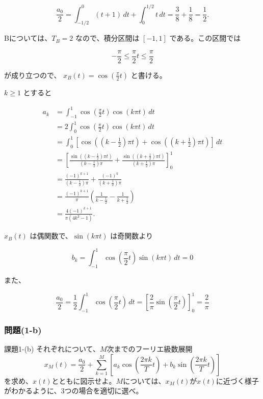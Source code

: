 \documentclass[a4j]{jarticle}
\begin{document}
\[
\frac{a_0}{2}
=\int_{-1/2}^{0}(t+1)\,dt+\int_0^{1/2}t\,dt
=\frac38+\frac18=\frac12.
\]

Bについては、$T_B=2$ なので、積分区間は $[-1,1]$ である。この区間では

\[
-\frac{\pi}{2}\le \frac{\pi}{2}t\le \frac{\pi}{2}
\]

が成り立つので、 $x_B(t)=\cos(\frac{\pi}{2}t)$ と書ける。

$k\ge 1$ とすると

\[
\begin{aligned}
a_k
&=\int_{-1}^{1}\cos\left(\frac{\pi}{2}t\right)\cos(k\pi t)\,dt\\
&=2\int_0^1\cos\left(\frac{\pi}{2}t\right)\cos(k\pi t)\,dt\\
&=\int_0^1\left[
\cos\left(\left(k-\frac12\right)\pi t\right)
+\cos\left(\left(k+\frac12\right)\pi t\right)
\right]\,dt\\
&=\left[
\frac{\sin\left(\left(k-\frac12\right)\pi t\right)}{\left(k-\frac12\right)\pi}
+\frac{\sin\left(\left(k+\frac12\right)\pi t\right)}{\left(k+\frac12\right)\pi}
\right]_0^1\\
&=\frac{(-1)^{k+1}}{\left(k-\frac12\right)\pi}
+\frac{(-1)^k}{\left(k+\frac12\right)\pi}\\
&=\frac{(-1)^{k+1}}{\pi}
\left(\frac{1}{k-\frac12}-\frac{1}{k+\frac12}\right)\\
&=\frac{4(-1)^{k+1}}{\pi(4k^2-1)}.
\end{aligned}
\]

$x_B(t)$ は偶関数で、$\sin(k\pi t)$ は奇関数より

\[
b_k=\int_{-1}^{1}\cos\left(\frac{\pi}{2}t\right)\sin(k\pi t)\,dt=0
\]

また、

\[
\frac{a_0}{2}
=\frac12\int_{-1}^{1}\cos\left(\frac{\pi}{2}t\right)\,dt
=\left[\frac{2}{\pi}\sin\left(\frac{\pi}{2}t\right)\right]_0^1
=\frac{2}{\pi}
\]


\subsubsection{問題(1-b)}
\begin{itembox}[l]{課題1-(b)}
それぞれについて、$M$次までのフーリエ級数展開
\[
  x_M(t)=\frac{a_0}{2}+\sum_{k=1}^{M}\left[
    a_k\cos\left(\frac{2\pi k}{T}t\right)
    +b_k\sin\left(\frac{2\pi k}{T}t\right)
  \right]
\]
を求め、$x(t)$とともに図示せよ。$M$については、$x_M(t)$が$x(t)$に近づく様子がわかるように、3つの場合を適切に選べ。
\end{itembox}
\end{document}
